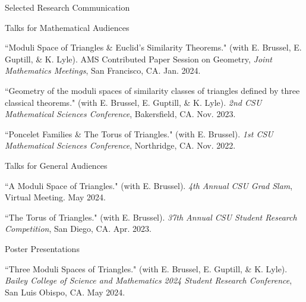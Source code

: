 \documentclass[
	11pt, %
]{cv} %
\begin{document}
\begin{rSection}{Selected Research Communication}

	\begin{rSubsectionNumbered}{Talks for Mathematical Audiences}
		\item ``Moduli Space of Triangles \& Euclid's Similarity Theorems." (with E. Brussel, E. Guptill, \& K. Lyle). AMS Contributed Paper Session on Geometry, \textit{ Joint Mathematics Meetings},
		San Francisco, CA. Jan. 2024.

		\item ``Geometry of the moduli spaces of similarity classes of triangles defined by three classical theorems." (with E. Brussel, E. Guptill, \& K. Lyle). \textit{ 2nd CSU Mathematical Sciences Conference},
		Bakersfield, CA. Nov. 2023.

		\item ``Poncelet Families \& The Torus of Triangles." (with E. Brussel). \textit{1st CSU Mathematical Sciences Conference},
		Northridge, CA. Nov. 2022.
	\end{rSubsectionNumbered}
	\begin{rSubsectionNumbered}{Talks for General Audiences}
		\item ``A Moduli Space of Triangles." (with E. Brussel). \textit{4th Annual CSU Grad Slam},
		Virtual Meeting. May 2024.




		\item ``The Torus of Triangles." (with E. Brussel). \textit{ 37th Annual CSU Student Research Competition},
		San Diego, CA. Apr. 2023.

	\end{rSubsectionNumbered}
	\begin{rSubsectionNumbered}{Poster Presentations}
		\item ``Three Moduli Spaces of Triangles." (with E. Brussel, E. Guptill, \& K. Lyle).  \textit{Bailey College of Science and Mathematics 2024 Student Research Conference}, San Luis Obispo, CA. May 2024.


\end{rSubsectionNumbered}
\end{rSection}
\end{document}
